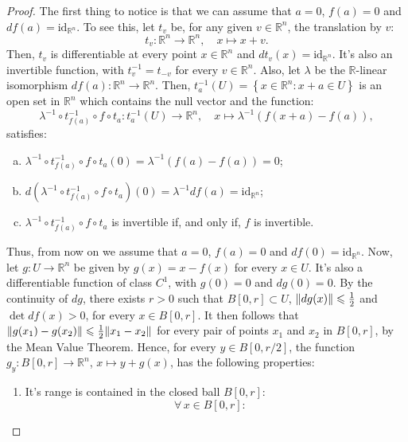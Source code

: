 \begin{proof}
	The first thing to notice is that we can assume that \({a=0}\), \(f(a)=0\) and \(df(a)=\text{id}_{\mathbb{R}^{n}}\). To see this, let \(t_{v}\) be, for any given \({v}\in{\mathbb{R}^{n}}\), the translation by \(v\):
	\[
		t_{v}:\mathbb{R}^{n}\to\mathbb{R}^{n},\quad{{x}\mapsto{x+v}}.
	\]
	Then, \(t_{v}\) is differentiable at every point \({x}\in{\mathbb{R}^{n}}\)
	and \(dt_{v}(x)=\text{id}_{\mathbb{R}^{n}}\). It's also an invertible
	function, with \(t_{v}^{-1}=t_{-v}\) for every \({v}\in{\mathbb{R}^{n}}\).
	Also, let \(\lambda\) be the \(\mathbb{R}\)-linear isomorphism
	\(df(a):\mathbb{R}^{n}\to\mathbb{R}^{n}\). Then,
	\(t_{a}^{-1}(U)=\left\{{x}\in{\mathbb{R}^{n}}:{x+a}\in{U}\right\}\) is an open
	set in \(\mathbb{R}^{n}\) which contains the null vector and the function:
	\[
		\lambda^{-1}\circ{t_{f(a)}^{-1}}\circ{f}\circ{t_{a}}:t_{a}^{-1}(U)\to\mathbb{R}^{n},\quad{{x}\mapsto{\lambda^{-1}(f(x+a)-f(a))}},
	\]
	satisfies:
	\begin{enumerate}[a.]
		\item
		      \(\lambda^{-1}\circ{t_{f(a)}^{-1}}\circ{f}\circ{t_{a}}(0)=\lambda^{-1}\left(f(a)-f(a)\right)=0\);
		\item
		      \(d(\lambda^{-1}\circ{t_{f(a)}^{-1}}\circ{f}\circ{t_{a}})(0)=\lambda^{-1}df(a)=\text{id}_{\mathbb{R}^{n}}\);
		\item
		      \(\lambda^{-1}\circ{t_{f(a)}^{-1}}\circ{f}\circ{t_{a}}\) is
		      invertible if, and only if, \(f\) is invertible.
	\end{enumerate}
	Thus, from now on we assume that \(a=0\), \(f(a)=0\) and
	\(df(0)=\text{id}_{\mathbb{R}^{n}}\). Now, let \(g:{U}\to{\mathbb{R}^{n}}\) be
	given by \(g(x)=x-f(x)\) for every \({x}\in{U}\). It's also a differentiable
	function of class \(C^{1}\), with \(g(0)=0\) and \(dg(0)=0\). By the
	continuity of \(dg\), there exists \(r>0\) such that \({B[0,r]}\subset{U}\),
	\(\lVert dg(x)\rVert\leqslant{\frac{1}{2}}\) and \(\det{df(x)}>0\), for every
	\({x}\in{B[0,r]}\). It then follows that
	\(\lVert g(x_{1})-g(x_{2})\rVert\leqslant{\frac{1}{2}\lVert x_{1}-x_{2}\rVert}\) for every
	pair of points \(x_{1}\) and \(x_{2}\) in \(B[0,r]\), by the Mean Value
	Theorem. Hence, for every \({y}\in{B[0,r/2]}\), the function
	\(g_{y}:B[0,r]\to\mathbb{R}^{n}\), \({x}\mapsto{y+g(x)}\), has the following
	properties:
	\begin{enumerate}
		\item
		      It's range is contained in the closed ball \(B[0,r]\):
		      \[
			      \forall\,{x}\in{B[0,r]}:\quad
\]
\end{enumerate}
\end{proof}
